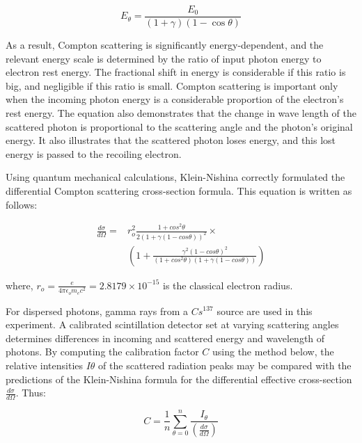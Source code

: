 	$$E_\theta = \frac{E_0}{(1+\gamma)(1-\cos\theta)}$$

	As a result, Compton scattering is significantly energy-dependent, and the relevant energy scale is determined by the ratio of input photon energy to electron rest energy. The fractional shift in energy is considerable if this ratio is big, and negligible if this ratio is small. Compton scattering is important only when the incoming photon energy is a considerable proportion of the electron's rest energy. The equation also demonstrates that the change in wave length of the scattered photon is proportional to the scattering angle and the photon's original energy. It also illustrates that the scattered photon loses energy, and this lost energy is passed to the recoiling electron.

	Using quantum mechanical calculations, Klein-Nishina correctly formulated the differential Compton scattering cross-section formula. This equation is written as follows:

	\begin{equation}
		\begin{split}
			\frac{d\sigma}{d\Omega} = & r_o^2\frac{1+ cos^2\theta}{2(1+\gamma(1-cos\theta))^2} \times \\
		 & \left(1+\frac{\gamma^2(1-cos\theta)^2}{(1+ cos^2\theta)(1+\gamma(1-cos\theta))}\right)
		\end{split}
		\label{eq:1}
	\end{equation}

	where, $r_o=\frac{e}{4\pi\epsilon_om_ec^2} = 2.8179 \times 10^{-15}  $ is the classical electron radius.

	For dispersed photons, gamma rays from a $Cs^{137}$ source are used in this experiment. A calibrated scintillation detector set at varying scattering angles determines differences in incoming and scattered energy and wavelength of photons. By computing the calibration factor $C$ using the method below, the relative intensities $I\theta$ of the scattered radiation peaks may be compared with the predictions of the Klein-Nishina formula for the differential effective cross-section $\frac{d\sigma}{d\Omega}$. Thus:

	$$C=\frac{1}{n}\sum_{\theta=0}^{n}\frac{I_\theta}{(\frac{d\sigma}{d\Omega})}$$

	